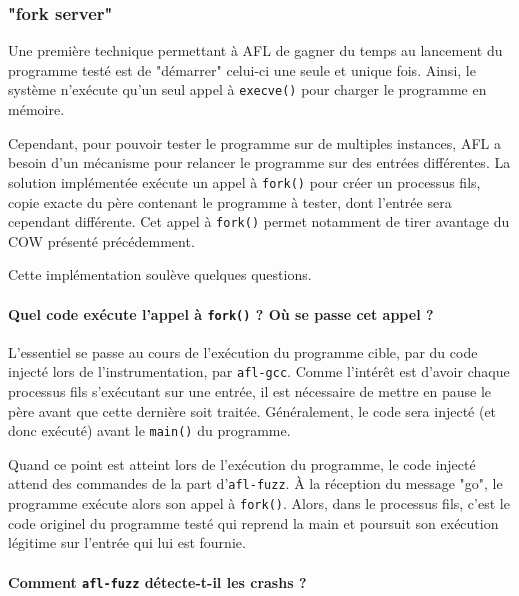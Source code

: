 \subsubsection{"fork server"}
Une première technique permettant à AFL de gagner du temps au lancement du programme testé est de "démarrer" celui-ci une seule et unique fois.
Ainsi, le système n'exécute qu'un seul appel à \lstinline{execve()} pour charger le programme en mémoire.

Cependant, pour pouvoir tester le programme sur de multiples instances, AFL a besoin d'un mécanisme pour relancer le programme sur des entrées différentes.
La solution implémentée exécute un appel à \lstinline{fork()} pour créer un processus fils, copie exacte du père contenant le programme à tester, dont l'entrée sera cependant différente.
Cet appel à \lstinline{fork()} permet notamment de tirer avantage du COW présenté précédemment.

Cette implémentation soulève quelques questions.

\paragraph{Quel code exécute l'appel à \lstinline{fork()} ? Où se passe cet appel ?}

L'essentiel se passe au cours de l'exécution du programme cible, par du code injecté lors de l'instrumentation, par \lstinline{afl-gcc}.
Comme l'intérêt est d'avoir chaque processus fils s'exécutant sur une entrée, il est nécessaire de mettre en pause le père avant que cette dernière soit traitée.
Généralement, le code sera injecté (et donc exécuté) avant le \lstinline{main()} du programme.

Quand ce point est atteint lors de l'exécution du programme, le code injecté attend des commandes de la part d'\lstinline{afl-fuzz}.
À la réception du message "go", le programme exécute alors son appel à \lstinline{fork()}.
Alors, dans le processus fils, c'est le code originel du programme testé qui reprend la main et poursuit son exécution légitime sur l'entrée qui lui est fournie.


\paragraph{Comment \lstinline{afl-fuzz} détecte-t-il les crashs ?}

